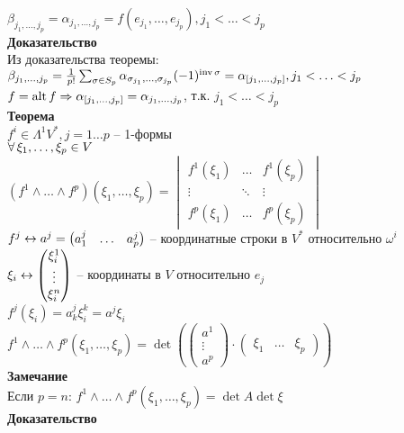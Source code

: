 \documentclass[12pt]{article}
\begin{document}
$\beta_{j_1,\ldots,j_p} = \alpha_{j_1,\ldots,j_p} = f(e_{j_1}, \ldots, e_{j_p}), j_1 < \ldots < j_p$\\
\textbf{Доказательство}\\
Из доказательства теоремы:\\
$\beta_{j_1,\ldots,j_p} = \frac1{p!}\sum_{\sigma \in S_p} \alpha_{\sigma_{j_1},\ldots,\sigma_{j_p}}(-1)^{\operatorname{inv} \sigma} = \alpha_{[j_1,\ldots,j_p]}, j_1<\ldots<j_p$\\
$f = \operatorname{alt} f \Rightarrow \alpha_{[j_1, \ldots,j_p]} = \alpha_{j_1,\ldots,j_p}$, т.к. $j_1<\ldots<j_p$\\
\textbf{Теорема}\\
$f^i \in \Lambda^1 V^*, j = 1\ldots p$ -- 1-формы\\
$\forall\, \xi_1,\ldots,\xi_p \in V$\\
$(f^1 \land \ldots \land f^p)(\xi_1,\ldots,\xi_p) = \begin{vmatrix}
    f^1(\xi_1) & \ldots & f^1(\xi_p)\\
    \vdots & \ddots & \vdots\\
    f^p(\xi_1) & \ldots & f^p(\xi_p)
\end{vmatrix}$\\
$f^j \leftrightarrow a^j = \begin{pmatrix}
    a_1^j & \ldots & a_p^j
\end{pmatrix}$ -- координатные строки в $V^*$ относительно $\omega^i$\\
$\xi_i \leftrightarrow \begin{pmatrix}
    \xi_i^1\\
    \vdots\\
    \xi_i^n
\end{pmatrix}$ -- координаты в $V$ относительно $e_j$\\
$f^j(\xi_i) = a_k^j \xi_i^k = a^j\xi_i$\\
$f^1 \land \ldots \land f^p(\xi_1,\ldots,\xi_p) = \det(\begin{pmatrix}
    a^1\\
    \vdots\\
    a^p
\end{pmatrix} \cdot \begin{pmatrix}
    \xi_1 & \ldots & \xi_p
\end{pmatrix})$\\
\textbf{Замечание}\\
Если $p=n$: $f^1 \land \ldots \land f^p(\xi_1,\ldots,\xi_p)=\det A \det \xi$\\
\textbf{Доказательство}\\
\end{document}
